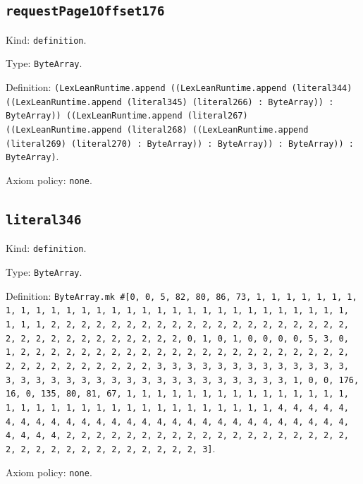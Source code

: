 \documentclass[11pt]{article}
\begin{document}
\subsection*{\texttt{requestPage1Offset176}}
\noindent Kind: \texttt{definition}.\par
\noindent Type: \texttt{ByteArray}.\par
\noindent Definition: \texttt{(LexLeanRuntime.append ((LexLeanRuntime.append (literal344) ((LexLeanRuntime.append (literal345) (literal266) : ByteArray)) : ByteArray)) ((LexLeanRuntime.append (literal267) ((LexLeanRuntime.append (literal268) ((LexLeanRuntime.append (literal269) (literal270) : ByteArray)) : ByteArray)) : ByteArray)) : ByteArray)}.\par
\noindent Axiom policy: \texttt{none}.\par
\subsection*{\texttt{literal346}}
\noindent Kind: \texttt{definition}.\par
\noindent Type: \texttt{ByteArray}.\par
\noindent Definition: \texttt{ByteArray.mk \#[0, 0, 5, 82, 80, 86, 73, 1, 1, 1, 1, 1, 1, 1, 1, 1, 1, 1, 1, 1, 1, 1, 1, 1, 1, 1, 1, 1, 1, 1, 1, 1, 1, 1, 1, 1, 1, 1, 1, 1, 2, 2, 2, 2, 2, 2, 2, 2, 2, 2, 2, 2, 2, 2, 2, 2, 2, 2, 2, 2, 2, 2, 2, 2, 2, 2, 2, 2, 2, 2, 2, 2, 0, 1, 0, 1, 0, 0, 0, 0, 5, 3, 0, 1, 2, 2, 2, 2, 2, 2, 2, 2, 2, 2, 2, 2, 2, 2, 2, 2, 2, 2, 2, 2, 2, 2, 2, 2, 2, 2, 2, 2, 2, 2, 2, 2, 3, 3, 3, 3, 3, 3, 3, 3, 3, 3, 3, 3, 3, 3, 3, 3, 3, 3, 3, 3, 3, 3, 3, 3, 3, 3, 3, 3, 3, 3, 3, 3, 1, 0, 0, 176, 16, 0, 135, 80, 81, 67, 1, 1, 1, 1, 1, 1, 1, 1, 1, 1, 1, 1, 1, 1, 1, 1, 1, 1, 1, 1, 1, 1, 1, 1, 1, 1, 1, 1, 1, 1, 1, 1, 1, 4, 4, 4, 4, 4, 4, 4, 4, 4, 4, 4, 4, 4, 4, 4, 4, 4, 4, 4, 4, 4, 4, 4, 4, 4, 4, 4, 4, 4, 4, 4, 4, 2, 2, 2, 2, 2, 2, 2, 2, 2, 2, 2, 2, 2, 2, 2, 2, 2, 2, 2, 2, 2, 2, 2, 2, 2, 2, 2, 2, 2, 2, 2, 2, 3]}.\par
\noindent Axiom policy: \texttt{none}.\par
\end{document}
